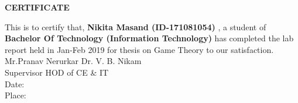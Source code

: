 \documentclass[letterpaper,12pt,oneside]{report}
\begin{document}
\begin{titlepage}
\vspace*{2\baselineskip}
\begin{center} \begin{Huge} \textbf{CERTIFICATE}\end{Huge} \end{center} 
\vspace*{2\baselineskip}
\Large
This  is  to  certify  that, \textbf{Nikita Masand (ID-171081054)} , a  student  of  \textbf{Bachelor  Of  Technology (Information Technology)} has  completed  the  lab  report  held  in  Jan-Feb  2019  for  thesis on Game Theory   to  our  satisfaction.
\vspace*{14\baselineskip}\\
Mr.Pranav Nerurkar \hspace{0.8in}    \hspace{0.5in}           Dr. V. B. Nikam\\
\hspace{0.8in} Supervisor  \hspace{1in}          \hspace{1.1in}  HOD of CE \& IT
\vspace*{2\baselineskip}
\\Date:\\Place:                   
\end{titlepage}

\end{document}
